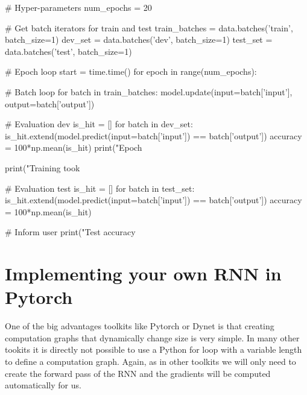 \begin{exercise}
\begin{python}
# Hyper-parameters
num_epochs = 20

# Get batch iterators for train and test
train_batches = data.batches('train', batch_size=1)
dev_set = data.batches('dev', batch_size=1)
test_set = data.batches('test', batch_size=1)

# Epoch loop
start = time.time()
for epoch in range(num_epochs):

    # Batch loop
    for batch in train_batches:
        model.update(input=batch['input'], output=batch['output'])

    # Evaluation dev
    is_hit = []
    for batch in dev_set:
        is_hit.extend(model.predict(input=batch['input']) == batch['output'])
    accuracy = 100*np.mean(is_hit)
    print("Epoch %

print("Training took %

# Evaluation test
is_hit = []
for batch in test_set:
    is_hit.extend(model.predict(input=batch['input']) == batch['output'])
accuracy = 100*np.mean(is_hit)

# Inform user
print("Test accuracy %
\end{python}
\end{exercise}

\clearpage
\section{Implementing your own RNN in Pytorch}

One of the big advantages toolkits like Pytorch or Dynet is that creating computation graphs that dynamically change size is very simple. In many other tookits it is directly not possible to use a Python for loop with a variable length to define a computation graph. Again, as in other toolkits we will only need to create the forward pass of the RNN and the gradients will be computed automatically for us.

